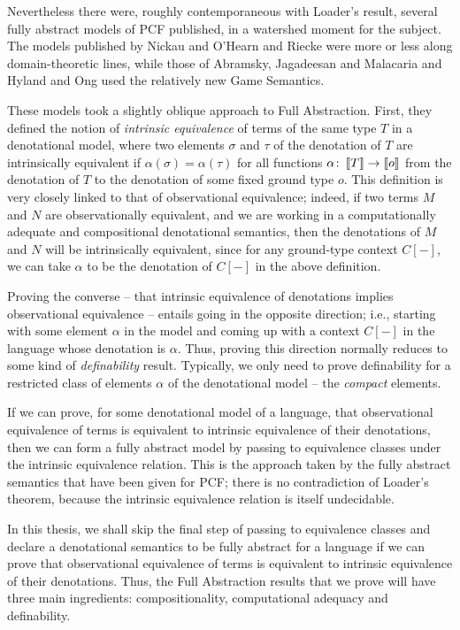 \documentclass[11pt]{report}
\begin{document}
Nevertheless there were, roughly contemporaneous with Loader's result, several fully abstract models of PCF published, in a watershed moment for the subject.
The models published by Nickau \cite{NickauPcf} and O'Hearn and Riecke \cite{OHearnRieckePcf} were more or less along domain-theoretic lines, while those of Abramsky, Jagadeesan and Malacaria \cite{ajmPcf} and Hyland and Ong \cite{hoPcf} used the relatively new Game Semantics.

These models took a slightly oblique approach to Full Abstraction.  
First, they defined the notion of \emph{intrinsic equivalence} of terms of the same type $T$ in a denotational model, where two elements $\sigma$ and $\tau$ of the denotation of $T$ are intrinsically equivalent if $\alpha(\sigma)=\alpha(\tau)$ for all functions $\alpha\colon\left\llbracket T\right\rrbracket\to\left\llbracket o\right\rrbracket$ from the denotation of $T$ to the denotation of some fixed ground type $o$.
This definition is very closely linked to that of observational equivalence; indeed, if two terms $M$ and $N$ are observationally equivalent, and we are working in a computationally adequate and compositional denotational semantics, then the denotations of $M$ and $N$ will be intrinsically equivalent, since for any ground-type context $C[-]$, we can take $\alpha$ to be the denotation of $C[-]$ in the above definition.

Proving the converse -- that intrinsic equivalence of denotations implies observational equivalence -- entails going in the opposite direction; i.e., starting with some element $\alpha$ in the model and coming up with a context $C[-]$ in the language whose denotation is $\alpha$.  
Thus, proving this direction normally reduces to some kind of \emph{definability} result.  
Typically, we only need to prove definability for a restricted class of elements $\alpha$ of the denotational model -- the \emph{compact} elements.

If we can prove, for some denotational model of a language, that observational equivalence of terms is equivalent to intrinsic equivalence of their denotations, then we can form a fully abstract model by passing to equivalence classes under the intrinsic equivalence relation.  
This is the approach taken by the fully abstract semantics that have been given for PCF; there is no contradiction of Loader's theorem, because the intrinsic equivalence relation is itself undecidable.

In this thesis, we shall skip the final step of passing to equivalence classes and declare a denotational semantics to be fully abstract for a language if we can prove that observational equivalence of terms is equivalent to intrinsic equivalence of their denotations.  
Thus, the Full Abstraction results that we prove will have three main ingredients: compositionality, computational adequacy and definability.
\end{document}
